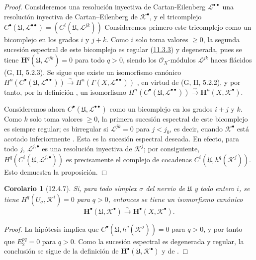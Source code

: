 \documentclass[10pt,oneside,openany]{book}
\theoremstyle{egaenv}\newtheorem*{env}{---}
\theoremstyle{egastatement}
\newtheorem*{corollary}{Corolario}
\theoremstyle{egadescription}
\newcommand{\oldpage}[2][]{\marginnote{\normalfont\scriptsize\textbf{#1}\,|\,#2}\ignorespaces}
\renewcommand{\geq}{\geqslant}
\begin{document}
\begin{proof}
Consideremos una resolución inyectiva de Cartan-Eilenberg $\mathcal L^{\bullet\bullet}$ una resolución inyectiva de
Cartan--Eilenberg de $\mathcal K^\bullet$, y el tricomplejo $C^\bullet(\mathfrak U,\mathcal L^{\bullet\bullet})
=(C^i(\mathfrak U,\mathcal L^{jk}))$
Consideremos primero este tricomplejo como un bicomplejo en los grados $i$ y
$j+k$.
Como $i$ solo toma valores $\geq0$, la segunda sucesión espectral de este bicomplejo es regular (\hyperref[0.11.3.3-fr]{11.3.3}) y degenerada, pues se tiene $\mathbf H^q(\mathfrak U,\mathcal L^{jk})=0$ para todo $q>0$, siendo los $\mathcal O_X$-módulos $\mathcal L^{jk}$ haces flácidos
\oldpage[0\textsubscript{III}]{64}
(G, II, 5.2.3).
Se sigue que existe un isomorfismo canónico
$H^n(C^\bullet(\mathfrak U,\mathcal L^{\bullet\bullet}))\xrightarrow{\sim}H^n(\Gamma(X,\mathcal L^{\bullet\bullet}))$
, en virtud de (G, II, 5.2.2), y por tanto, por la
definición , un isomorfismo
$H^n(C^\bullet(\mathfrak U,\mathcal L^{\bullet\bullet}))\xrightarrow{\sim}\mathbf H^n(X,\mathcal K^\bullet)$.

Consideremos ahora
$C^\bullet(\mathfrak U,\mathcal L^{\bullet\bullet})$
como un bicomplejo en los grados $i+j$ y $k$.
Como $k$ solo toma valores $\geq0$, la primera sucesión espectral de este bicomplejo es siempre regular; es birregular si $\mathcal L^{jk}=0$ para $j<j_0$, es decir, cuando
$\mathcal K^\bullet$ está acotado inferiormente .
Esta es la sucesión espectral deseada.
En efecto, para todo $j$, $\mathcal L^{j,\bullet}$ es una resolución
inyectiva de $\mathcal K^j$; por consiguiente,
$H^q(C^i(\mathfrak U,\mathcal L^{j,\bullet}))$
es precisamente el complejo de cocadenas
$C^i(\mathfrak U,h^q(\mathcal K^j))$.
Esto demuestra la proposición.
\end{proof}

\begin{corollary}[12.4.7]
\label{0.12.4.7}
\label{0.12.4.7-fr}
Si, para todo símplex $\sigma$ del nervio de $\mathfrak U$ y
todo entero $i$, se tiene $H^q(U_\sigma,\mathcal K^i)=0$ para $q>0$, entonces se tiene un isomorfismo canónico
\begin{equation}
\label{0.12.4.7.1-fr}
\tag{12.4.7.1}
\mathbf H^\bullet(\mathfrak U,\mathcal K^\bullet)
\xrightarrow{\sim}\mathbf H^\bullet(X,\mathcal K^\bullet).
\end{equation}
\end{corollary}

\begin{proof}
La hipótesis implica que
$C^\bullet(\mathfrak U,h^q(\mathcal K^j))=0$ para $q>0$, y por tanto que
$E_2^{pq}=0$ para $q>0$.
Como la sucesión espectral  es degenerada y
regular, la conclusión se sigue de la definición
 de
$\mathbf H^\bullet(\mathfrak U,\mathcal K^\bullet)$ y de
.
\end{proof}
\end{document}
